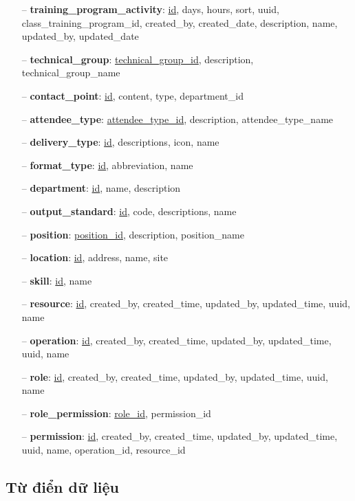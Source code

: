 \documentclass[report.tex]{subfiles}
\begin{document}
\begin{enumerate}[nosep]
\item[--] \textbf{training\_program\_activity}: \underline{id}, days, hours, sort, uuid, class\_training\_program\_id, created\_by, created\_date, description, name, updated\_by, updated\_date
\item[--] \textbf{technical\_group}: \underline{technical\_group\_id}, description, technical\_group\_name
\item[--] \textbf{contact\_point}: \underline{id}, content, type, department\_id
\item[--] \textbf{attendee\_type}: \underline{attendee\_type\_id}, description, attendee\_type\_name
\item[--] \textbf{delivery\_type}: \underline{id}, descriptions, icon, name
\item[--] \textbf{format\_type}: \underline{id}, abbreviation, name
\item[--] \textbf{department}: \underline{id}, name, description
\item[--] \textbf{output\_standard}: \underline{id}, code, descriptions, name
\item[--] \textbf{position}: \underline{position\_id}, description, position\_name
\item[--] \textbf{location}: \underline{id}, address, name, site
\item[--] \textbf{skill}: \underline{id}, name
\item[--] \textbf{resource}: \underline{id}, created\_by, created\_time, updated\_by, updated\_time, uuid, name
\item[--] \textbf{operation}: \underline{id}, created\_by, created\_time, updated\_by, updated\_time, uuid, name
\item[--] \textbf{role}: \underline{id}, created\_by, created\_time, updated\_by, updated\_time, uuid, name
\item[--] \textbf{role\_permission}: \underline{role\_id}, permission\_id
\item[--] \textbf{permission}: \underline{id}, created\_by, created\_time, updated\_by, updated\_time, uuid, name, operation\_id, resource\_id
\end{enumerate}

\subsection{Từ điển dữ liệu}
\end{document}
